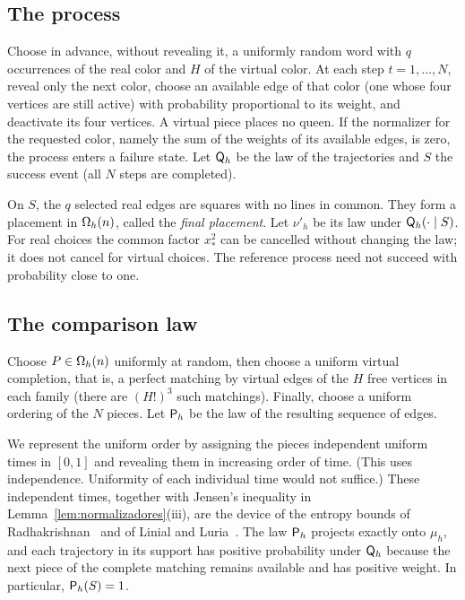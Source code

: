 \subsection{The process}

\begin{definicion}\label{def:referencia} Choose in advance, without revealing it, a
uniformly random word with $q$
occurrences of the real color and $H$ of the virtual color. At each step $t=1,\dots,N$, reveal only the next
color, choose an available
edge of that color (one whose four vertices are still active) with probability proportional to its weight,
and deactivate its four
vertices. A virtual piece places no queen. If the normalizer for the requested color, namely the sum of the
weights of its available
edges, is zero, the process enters a failure state. Let $\mathsf{Q}_h$ be the law of the trajectories and $S$ the
success event (all $N$ steps
are completed). \end{definicion}

On $S$, the $q$ selected real edges are squares with no lines in common. They form a placement in
$\Omega_h(n)$, called the \emph{final
placement}. Let $\nu'_h$ be its law under $\mathsf{Q}_h(\cdot\mid S)$. For real choices the common factor $x_*^2$
can be cancelled without
changing the law; it does not cancel for virtual choices. The reference process need not succeed with
probability close to one.

\subsection{The comparison law}

\begin{definicion}\label{def:comparacion} Choose $P\in\Omega_h(n)$ uniformly at random, then
choose a uniform virtual
completion, that is, a perfect matching by virtual edges of the $H$ free vertices in each family (there are
$(H!)^3$ such matchings).
Finally, choose a uniform ordering of the $N$ pieces. Let $\mathsf{P}_h$ be the law of the resulting sequence of
edges. \end{definicion}

We represent the uniform order by assigning the pieces independent uniform times in $[0,1]$ and revealing
them in increasing order of
time. (This uses independence. Uniformity of each individual time would not suffice.) These independent
times, together with
Jensen's inequality in Lemma~\ref{lem:normalizadores}(iii), are the device of the entropy bounds of
Radhakrishnan~\cite{Radhakrishnan} and of Linial and Luria~\cite{LinialLuria}. The law $\mathsf{P}_h$ projects
exactly onto $\mu_h$, and
each trajectory in its support has positive probability under $\mathsf{Q}_h$ because the next piece of the complete
matching remains available
and has positive weight. In particular, $\mathsf{P}_h(S)=1$.

